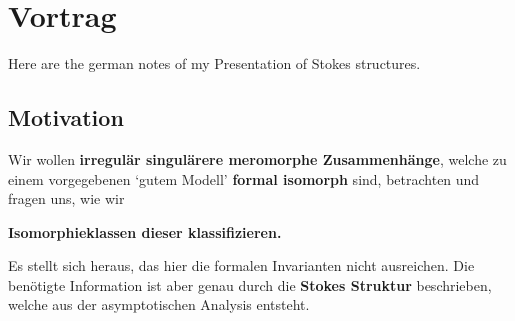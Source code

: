 \chapter{Vortrag}
Here are the german notes of my Presentation of Stokes structures.
\setcounter{section}{-1} \section{Motivation} %
Wir wollen \textbf{irregulär singulärere meromorphe Zusammenhänge}, welche zu
einem vorgegebenen `gutem Modell' \textbf{formal isomorph} sind, betrachten und
fragen uns, wie wir
\begin{center}
  \textbf{Isomorphieklassen dieser klassifizieren.}
\end{center}

Es stellt sich heraus, das hier die formalen Invarianten nicht ausreichen.
Die benötigte Information ist aber genau durch die \textbf{Stokes Struktur}
beschrieben, welche aus der asymptotischen Analysis entsteht.
